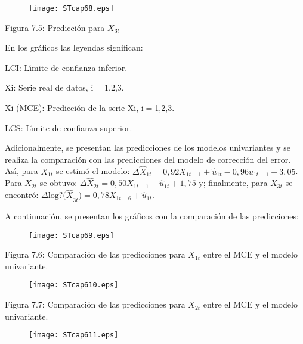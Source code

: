 \begin{figure}[H]
\texttt{[image: STcap68.eps]}
\label{fig8}
\end{figure}

\begin{center}
Figura 7.5: Predicci\'{o}n para $X_{3t}$
\end{center}

En los gr\'{a}ficos las leyendas significan:

LCI: L\'{\i}mite de confianza inferior.

Xi: Serie real de datos, i$=$1,2,3.

Xi (MCE): Predicci\'{o}n de la serie Xi, i$=$1,2,3.

LCS: L\'{\i}mite de confianza superior.

Adicionalmente, se presentan las predicciones de los modelos univariantes y 
se realiza la comparaci\'{o}n con las predicciones del modelo de 
correcci\'{o}n del error. As\'{\i}, para $X_{1t}$ se estim\'{o} el modelo: 
${\Delta \hat{X}}_{1t}=0,92X_{1t-1}+\hat{u}_{1t}-0,96u_{1t-1}+3,05$. Para 
$X_{2t}$ se obtuvo: ${\Delta \hat{X}}_{2t}=0,50X_{1t-1}+\hat{u}_{1t}+1,75$ 
y; finalmente, para $X_{3t}$ se encontr\'{o}: ${\Delta 
\mathrm{log?}(\hat{X}}_{3t})=0,78X_{1t-6}+\hat{u}_{1t}$.

A continuaci\'{o}n, se presentan los gr\'{a}ficos con la comparaci\'{o}n de 
las predicciones:

\begin{figure}[H]
\texttt{[image: STcap69.eps]}
\label{fig9}
\end{figure}

\begin{center}
Figura 7.6: Comparaci\'{o}n de las predicciones para $X_{1t}$ entre el MCE y 
el modelo univariante.
\end{center}

\begin{figure}[H]
\texttt{[image: STcap610.eps]}
\label{fig10}
\end{figure}

\begin{center}
Figura 7.7: Comparaci\'{o}n de las predicciones para $X_{2t}$ entre el MCE y 
el modelo univariante.
\end{center}

\begin{figure}[H]
\texttt{[image: STcap611.eps]}
\label{fig11}
\end{figure}


